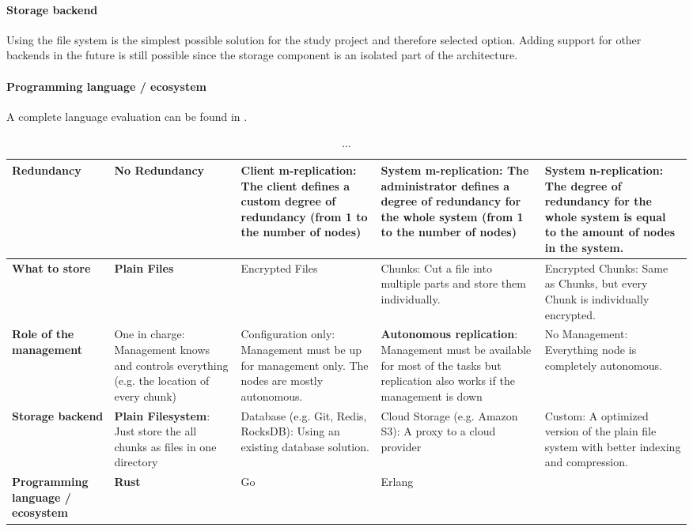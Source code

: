 \paragraph{Storage backend}
Using the file system is the simplest possible solution for the study project and therefore selected option. Adding support for other backends in the future is still possible since the storage component is an isolated part of the architecture. 

\paragraph{Programming language / ecosystem}
A complete language evaluation can be found in .


\begin{sidewaystable}
	\centering
	\caption[Morphological Box]{...}
	\label{tbl:morphological-box}
    \begin{tabu}{X | X X X X}
		\hline
          \textbf{Redundancy}
          & No Redundancy
          & Client m-replication: The \gls{client} defines a custom degree of redundancy (from 1 to the number of nodes)
          & System m-replication: The \gls{administrator} defines a degree of redundancy for the whole system (from 1 to the number of nodes)
          & \textbf{System n-replication}: The degree of redundancy for the whole system is equal to the amount of \glspl{node} in the system.
          \\ \hline

          \textbf{What to store}
          & \textbf{Plain Files}
          & Encrypted Files
          & Chunks: Cut a file into multiple parts and store them individually.
          & Encrypted Chunks: Same as Chunks, but every Chunk is individually encrypted.
          \\ \hline


          \textbf{Role of the management}
          & One in charge: Management knows and controls everything (e.g. the location of every chunk)
          & Configuration only: Management must be up for management only. The nodes are mostly autonomous.
          & \textbf{Autonomous replication}: Management must be available for most of the tasks but replication also works if the management is down
          & No Management: Everything node is completely autonomous.
          \\ \hline


          \textbf{Storage backend}
          & \textbf{Plain Filesystem}: Just store the all chunks as files in one directory
          & Database (e.g. Git, Redis, RocksDB): Using an existing database solution.
          & Cloud Storage (e.g. Amazon S3): A proxy to a cloud provider
          & Custom: A optimized version of the plain file system with better indexing and compression.
          \\ \hline


          \textbf{Programming language / ecosystem}
          & \textbf{Rust}
          & Go
          & Erlang
          & 
          \\ \hline
	\end{tabu}
\end{sidewaystable}
